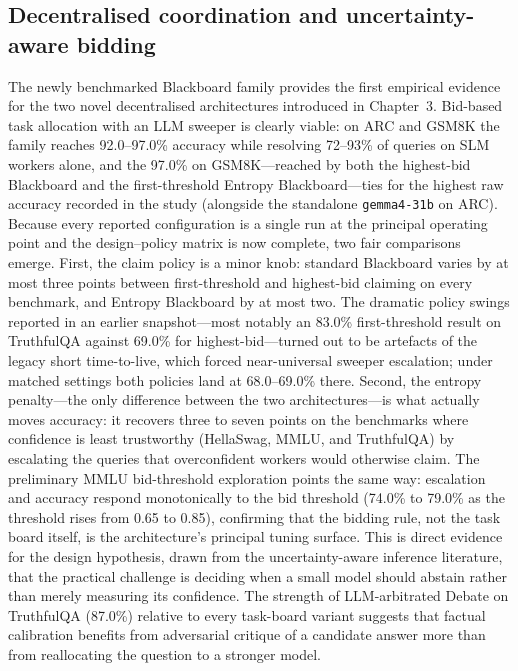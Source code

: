 \subsection{Decentralised coordination and uncertainty-aware bidding}
The newly benchmarked Blackboard family provides the first empirical evidence for the two novel decentralised architectures introduced in Chapter~3. Bid-based task allocation with an LLM sweeper is clearly viable: on ARC and GSM8K the family reaches 92.0--97.0\% accuracy while resolving 72--93\% of queries on SLM workers alone, and the 97.0\% on GSM8K---reached by both the highest-bid Blackboard and the first-threshold Entropy Blackboard---ties for the highest raw accuracy recorded in the study (alongside the standalone \texttt{gemma4-31b} on ARC). Because every reported configuration is a single run at the principal operating point and the design--policy matrix is now complete, two fair comparisons emerge. First, the claim policy is a minor knob: standard Blackboard varies by at most three points between first-threshold and highest-bid claiming on every benchmark, and Entropy Blackboard by at most two. The dramatic policy swings reported in an earlier snapshot---most notably an 83.0\% first-threshold result on TruthfulQA against 69.0\% for highest-bid---turned out to be artefacts of the legacy short time-to-live, which forced near-universal sweeper escalation; under matched settings both policies land at 68.0--69.0\% there. Second, the entropy penalty---the only difference between the two architectures---is what actually moves accuracy: it recovers three to seven points on the benchmarks where confidence is least trustworthy (HellaSwag, MMLU, and TruthfulQA) by escalating the queries that overconfident workers would otherwise claim. The preliminary MMLU bid-threshold exploration points the same way: escalation and accuracy respond monotonically to the bid threshold (74.0\% to 79.0\% as the threshold rises from 0.65 to 0.85), confirming that the bidding rule, not the task board itself, is the architecture's principal tuning surface. This is direct evidence for the design hypothesis, drawn from the uncertainty-aware inference literature, that the practical challenge is deciding when a small model should abstain rather than merely measuring its confidence. The strength of LLM-arbitrated Debate on TruthfulQA (87.0\%) relative to every task-board variant suggests that factual calibration benefits from adversarial critique of a candidate answer more than from reallocating the question to a stronger model.

